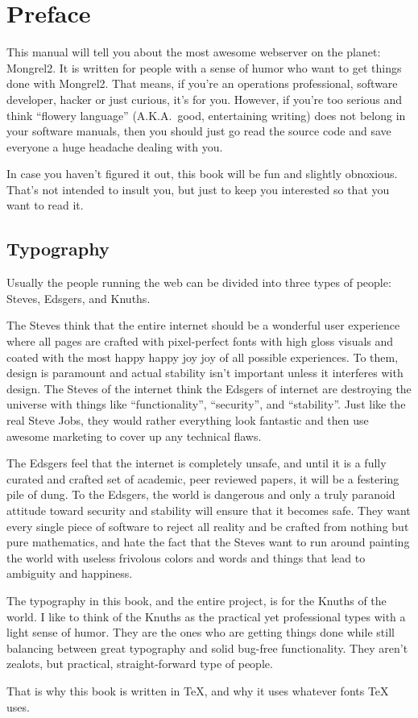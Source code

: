 \chapter{Preface}

This manual will tell you about the most awesome webserver on the planet:
Mongrel2.  It is written for people with a sense of humor who want to get
things done with Mongrel2.  That means, if you're an operations professional,
software developer, hacker or just curious, it's for you.  However, if you're
too serious and think ``flowery language'' (A.K.A.\ good, entertaining writing) does
not belong in your software manuals, then you should just go read the source
code and save everyone a huge headache dealing with you.

In case you haven't figured it out, this book will be fun and slightly
obnoxious.  That's not intended to insult you, but just to keep you interested
so that you want to read it.


\section*{Typography}

Usually the people running the web can be divided into three types of people:  Steves,
Edsgers, and Knuths.

The Steves think that the entire internet should be a wonderful user experience
where all pages are crafted with pixel-perfect fonts with high gloss visuals
and coated with the most happy happy joy joy of all possible experiences.  To
them, design is paramount and actual stability isn't important unless it
interferes with design.  The Steves of the internet think the Edsgers of
internet are destroying the universe with things like ``functionality'',
``security'', and ``stability''.  Just like the real Steve Jobs, they would rather
everything look fantastic and then use awesome marketing to cover up any
technical flaws.

The Edsgers feel that the internet is completely unsafe, and until it is a fully
curated and crafted set of academic, peer reviewed papers, it will be a festering
pile of dung.  To the Edsgers, the world is dangerous and only a truly paranoid
attitude toward security and stability will ensure that it becomes safe.  They
want every single piece of software to reject all reality and be crafted from
nothing but pure mathematics, and hate the fact that the Steves want to run
around painting the world with useless frivolous colors and words and things
that lead to ambiguity and happiness.

The typography in this book, and the entire project, is for the Knuths of the
world.  I like to think of the Knuths as the practical yet professional types
with a light sense of humor.  They are the ones who are getting things done
while still balancing between great typography and solid bug-free
functionality.  They aren't zealots, but practical, straight-forward type of
people.

That is why this book is written in \TeX, and why it uses whatever fonts \TeX{} uses.

